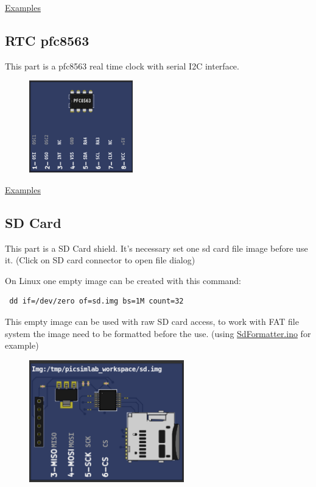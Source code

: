 \href{https://lcgamboa.github.io/picsimlab_examples/parts_RTC_ds1307.html}{Examples}


\subsection{RTC pfc8563}

This part is a pfc8563 real time clock with serial I2C interface.

\begin{figure}[H]
\center
\includegraphics[width=0.4\textwidth]{img/part_pcf8563.png} 
\end{figure}

\href{https://lcgamboa.github.io/picsimlab_examples/parts_RTC_pfc8563.html}{Examples}


\subsection{SD Card}

This part is a SD Card shield. It's necessary set one sd card file image before use it. (Click on SD card connector to open file dialog)

On Linux one empty image can be created with this command: 
\begin{verbatim}
 dd if=/dev/zero of=sd.img bs=1M count=32
\end{verbatim}
This empty image can be used with raw SD card access, to work with FAT file system  the image need to be formatted before the use. (using \href{https://github.com/greiman/SdFat/blob/master/examples/SdFormatter/SdFormatter.ino}{SdFormatter.ino} for example) 

\begin{figure}[H]
\center
\includegraphics[width=0.6\textwidth]{img/part_sdcard.png} 
\end{figure} 

